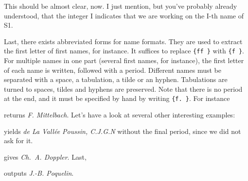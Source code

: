 This should be almost clear, now. I just mention, but you've probably already
understood, that the integer \el I indicates that we are working on the \el
I-th name of \eli S1. 

Last, there exists abbreviated forms for name formats. They are used to
extract the first letter of first names, for instance. It suffices to replace
\verb+{ff }+ with \verb+{f }+. For multiple names in one part
(several first names, for instance), the first 
letter of each name is written, followed with a period. Different names must
be separated with a space, a tabulation, a tilde or an hyphen. Tabulations
are turned to spaces, tildes and hyphens are preserved. Note that there is no
period at the end, and it must be specified by hand by writing \verb+{f. }+.
For instance
\begin{myexv}
\end{myexv} %
\noindent returns \textit{F. Mittelbach}. 
Let's have a look at several other interesting examples:
\begin{myexv}
\end{myexv} %
\noindent 
yields \emph{de La Vall\'ee Poussin, C.J.G.N} 
without the final period, since we did not ask for it.
\begin{myexv}
\end{myexv} %
\noindent gives \emph{Ch.~A. Doppler}. 
Last, 
\begin{myexv}
\end{myexv} %
\noindent outputs \emph{J.-B. Poquelin}.

